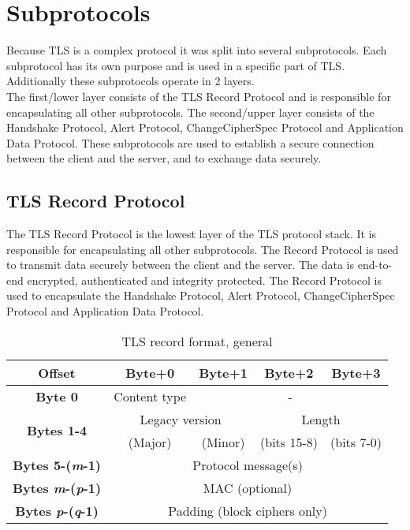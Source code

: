 \section{Subprotocols}

Because TLS is a complex protocol it was split into several subprotocols. Each subprotocol has its own purpose and is used in a specific part of TLS. Additionally these subprotocols operate in 2 layers.
\\
The first/lower layer consists of the TLS Record Protocol and is responsible for encapsulating all other subprotocols. The second/upper layer consists of the Handshake Protocol, Alert Protocol, ChangeCipherSpec Protocol and Application Data Protocol. These subprotocols are used to establish a secure connection between the client and the server, and to exchange data securely.


\subsection{TLS Record Protocol}

The TLS Record Protocol is the lowest layer of the TLS protocol stack. It is responsible for encapsulating all other subprotocols. The Record Protocol is used to transmit data securely between the client and the server. The data is end-to-end encrypted, authenticated and integrity protected. The Record Protocol is used to encapsulate the Handshake Protocol, Alert Protocol, ChangeCipherSpec Protocol and Application Data Protocol.

\begin{table}[htbp]
	\centering
	\begin{tabular}{|c|c|c|c|c|}
	\hline
	\textbf{Offset} & \textbf{Byte+0} & \textbf{Byte+1} & \textbf{Byte+2} & \textbf{Byte+3} \\ \hline
	\textbf{Byte 0} & Content type & \multicolumn{3}{c|}{-} \\ \hline
	\multirow{2}{*}{\textbf{Bytes 1-4}} & \multicolumn{2}{c|}{Legacy version} & \multicolumn{2}{c|}{Length} \\ \cline{2-5} 
	 & (Major) & (Minor) & (bits 15-8) & (bits 7-0) \\ \hline
	\textbf{Bytes 5-(\textit{m}-1)} & \multicolumn{4}{c|}{Protocol message(s)} \\ \hline
	\textbf{Bytes \textit{m}-(\textit{p}-1)} & \multicolumn{4}{c|}{MAC (optional)} \\ \hline
	\textbf{Bytes \textit{p}-(\textit{q}-1)} & \multicolumn{4}{c|}{Padding (block ciphers only)} \\ \hline
	\end{tabular}
	\caption{TLS record format, general}
    \label{tab:tls_record_format}
\end{table}
	
